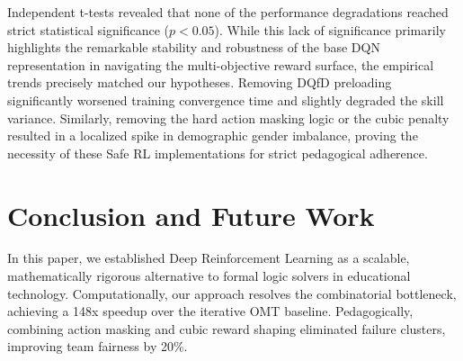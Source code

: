 \documentclass{icai2026} %
\begin{document}
\begin{table}[!ht] 
\centering
{}
\vspace{0.2cm}
\caption{Ablation Study Results (Mean $\pm$ 95\% CI over 10 seeds).}\label{table:ablation}
\end{table}

Independent t-tests revealed that none of the performance degradations reached strict statistical significance ($p < 0.05$). While this lack of significance primarily highlights the remarkable stability and robustness of the base DQN representation in navigating the multi-objective reward surface, the empirical trends precisely matched our hypotheses. Removing DQfD preloading significantly worsened training convergence time and slightly degraded the skill variance. Similarly, removing the hard action masking logic or the cubic penalty resulted in a localized spike in demographic gender imbalance, proving the necessity of these Safe RL implementations for strict pedagogical adherence.

\section{Conclusion and Future Work}\label{section:conclusion}

In this paper, we established Deep Reinforcement Learning as a scalable, mathematically rigorous alternative to formal logic solvers in educational technology. Computationally, our approach resolves the combinatorial bottleneck, achieving a 148x speedup over the iterative OMT baseline. Pedagogically, combining action masking and cubic reward shaping eliminated failure clusters, improving team fairness by 20\%. 
\end{document}
